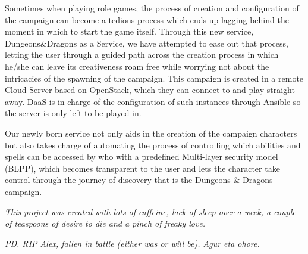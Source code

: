 \documentclass[a4paper,12pt]{report}
\begin{document}

Sometimes when playing role games, the process of creation and configuration of the campaign can become a tedious process which ends up lagging behind the moment in which to start the game itself. Through this new service, Dungeons\&Dragons as a Service, we have attempted to ease out that process, letting the user through a guided path across the creation process in which he/she can leave its creativeness roam free while worrying not about the intricacies of the spawning of the campaign. This campaign is created in a remote Cloud Server based on OpenStack, which they can connect to and play straight away. DaaS is in charge of the configuration of such instances through Ansible so the server is only left to be played in.

Our newly born service not only aids in the creation of the campaign characters but also takes charge of automating the process of controlling which abilities and spells can be accessed by who with a predefined Multi-layer security model (BLPP), which becomes transparent to the user and lets the character take control through the journey of discovery that is the Dungeons \& Dragons campaign.



\vskip 8cm

\textit{This project was created with lots of caffeine, lack of sleep over a week, a couple of teaspoons of desire to die and a pinch of freaky love.}

\textit{PD. RIP Alex, fallen in battle (either was or will be). Agur eta ohore.}
\end{document}
